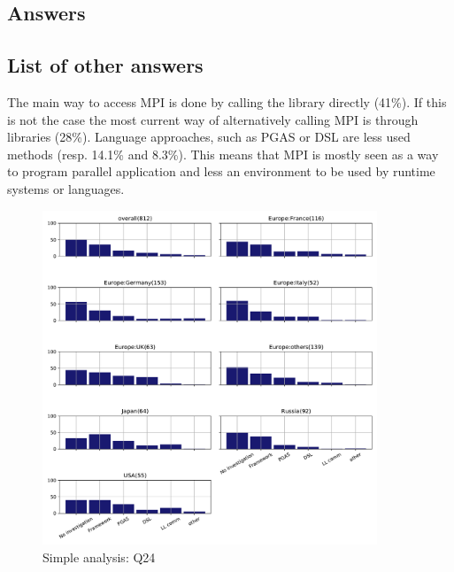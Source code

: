 
\subsection{Answers}



\subsection{List of other answers}
\begin{itemize}

\end{itemize}

The main way to access MPI is done by calling the library directly (41\%). If this is
not the case the most current way  of alternatively calling MPI is through
libraries (28\%). Language approaches, such as PGAS or DSL are less used methods
(resp. 14.1\% and 8.3\%).  This means that MPI is mostly seen as a way to program
parallel application and less an environment to be used by runtime systems or
languages.  

\begin{figure}[htb]
\begin{center}
\includegraphics[width=10cm]{../pdfs/Q24.pdf}
\caption{Simple analysis: Q24}
\label{fig:Q24}
\end{center}
\end{figure}

